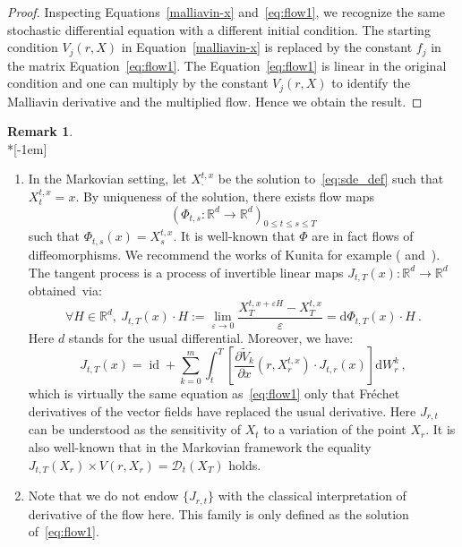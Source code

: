 \documentclass[11pt]{article}
\theoremstyle{definition}
\newtheorem{rema}[theo]{Remark}
\numberwithin{equation}{section}
\numberwithin{figure}{section}
\numberwithin{table}{section}
\DeclareMathOperator{\id}{id}
\newcommand*\R{\mathbb{R}}
\newcommand*\Dc{\mathcal{D}}
\newcommand*{\romanenumi}{\renewcommand*{\theenumi}{\roman{enumi}}}
\let\oldforall\forall
\renewcommand*{\forall}{\mathrel{\oldforall}}
\newcommand*{\dd}{\mathrm{d}}
\newcommand*{\dW}{\dd W}
\begin{document}
\begin{proof}
Inspecting Equations~\eqref{malliavin-x} and~\eqref{eq:flow1}, we recognize the same stochastic differential equation with a different initial condition. The starting condition $ V_j\left(r, X\right)$ in Equation~\eqref{malliavin-x} is replaced by the constant $f_j$ in the matrix Equation~\eqref{eq:flow1}. The Equation~\eqref{eq:flow1} is linear in the original condition and one can multiply by the constant $ V_j\left(r,X \right)$ to identify the Malliavin derivative and the multiplied flow. Hence we obtain the result.
\end{proof}

\begin{rema}\label{rmk:tangent_markov}\ \\*[-1em]
\begin{enumerate}\romanenumi
\item \label{3.4.1}In the Markovian setting, let $X_{\cdot}^{t,x}$ be the solution to~\eqref{eq:sde_def} such that $X_{t}^{t,x}=x$. By uniqueness of the solution, there exists flow maps
\[
\left(\Phi_{t,s}: \R^d \rightarrow \R^d \right)_{0 \leq t \leq s \leq T}
\]
such that $\Phi_{t,s}(x) = X_s^{t,x}$. It is well-known that $\Phi$ are in fact flows of diffeomorphisms. We recommend the works of Kunita for example (\cite{K84} and~\cite[Chapter~4]{kunita1997}). The tangent process is a process of invertible linear maps $J_{t,T}(x): \R^d \rightarrow \R^d$ obtained~via:
\[
\forall H \in \R^d, \ J_{t,T}(x) \cdot H
:= \lim_{\varepsilon \rightarrow 0} \frac{X_T^{t, x+\varepsilon H} - X_T^{t,x}}{\varepsilon}
= \dd \Phi_{t,T} (x) \cdot H \ .
\]
Here $d$ stands for the usual differential. Moreover, we have:
\[
J_{t,T}(x) = \id + \sum_{k=0}^m \int_t^T
\left[\frac{\partial \widetilde{V}_k}{\partial x}\left(r, X_r^{t,x} \right) \cdot J_{t,r}(x) \right] \dW_r^k \,,
\]
which is virtually the same equation as~\eqref{eq:flow1} only that Fréchet derivatives of the vector fields have replaced the usual derivative. Here $J_{r,t}$ can be understood as the sensitivity of $X_t$ to a variation of the point $X_r$. It is also well-known that in the Markovian framework the equality
$
J_{t, T}(X_r) \times V\left(r,X_r\right) = \Dc_t \left(X_T \right)$ holds.
\item \label{3.4.2}Note that we do not endow $\{J_{r,t}\}$ with the classical interpretation of derivative of the flow here. This family is only defined as the solution of~\eqref{eq:flow1}.
\end{enumerate}
\end{rema}
\end{document}
